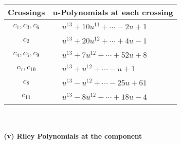 \documentclass[1p]{elsarticle_modified}
\theoremstyle{definition}
\begin{document}
\begin{tabular}{m{50pt}|m{274pt}}
Crossings & \hspace{64pt}u-Polynomials at each crossing \\
\hline $$\begin{aligned}c_{1},c_{3},c_{6}\end{aligned}$$&$\begin{aligned}
&u^{13}+10 u^{11}+\cdots-2 u+1
\end{aligned}$\\
\hline $$\begin{aligned}c_{2}\end{aligned}$$&$\begin{aligned}
&u^{13}+20 u^{12}+\cdots+4 u-1
\end{aligned}$\\
\hline $$\begin{aligned}c_{4},c_{5},c_{9}\end{aligned}$$&$\begin{aligned}
&u^{13}+7 u^{12}+\cdots+52 u+8
\end{aligned}$\\
\hline $$\begin{aligned}c_{7},c_{10}\end{aligned}$$&$\begin{aligned}
&u^{13}+u^{12}+\cdots- u+1
\end{aligned}$\\
\hline $$\begin{aligned}c_{8}\end{aligned}$$&$\begin{aligned}
&u^{13}- u^{12}+\cdots-25 u+61
\end{aligned}$\\
\hline $$\begin{aligned}c_{11}\end{aligned}$$&$\begin{aligned}
&u^{13}-8 u^{12}+\cdots+18 u-4
\end{aligned}$\\
\hline
\end{tabular}\\~\\
\newpage\renewcommand{\arraystretch}{1}
\flushleft \textbf{(v) Riley Polynomials at the component}\newline \\
\end{document}

